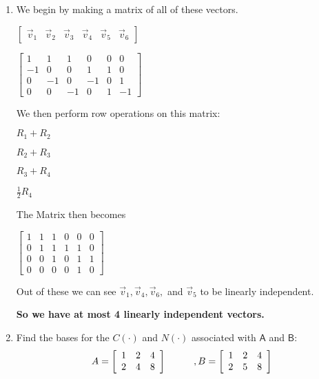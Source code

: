 \documentclass[a4paper, 11pt]{article}
\newcommand{\mat}[1]{\boldsymbol { \mathsf{#1}} }
\begin{document}
\begin{enumerate}
\item We begin by making a matrix of all of these vectors. 

\begin{center}

$
\begin{bmatrix}
\vec v_1 & \vec v_2 & \vec v_3 & \vec v_4 & \vec v_5 & \vec v_6  
\end{bmatrix}
$

$
\begin{bmatrix}
1 & 1 & 1 & 0 & 0 & 0 \\
-1 & 0 & 0 & 1 & 1 & 0\\
0 & -1 & 0 & -1 & 0 & 1\\ 
0 & 0 & -1 & 0 & 1 & -1 
\end{bmatrix}
$

\end{center}

We then perform row operations on this matrix:
\begin{center}
$R_1 + R_2$

$R_2 + R_3$

$R_3 + R_4$

$\frac{1}{2} R_4$
\end{center}

The Matrix then becomes 

\begin{center}
$
\begin{bmatrix}
1 & 1 & 1 & 0 & 0 & 0 \\
0 & 1 & 1 & 1 & 1 & 0\\
0 & 0 & 1 & 0 & 1 & 1\\ 
0 & 0 & 0 & 0 & 1 & 0 
\end{bmatrix}
$
\end{center}

Out of these we can see $\vec v_1, \vec v_4, \vec v_6,$ and $\vec v_5$ to be linearly independent.

\textbf{So we have at most 4 linearly independent vectors.}


\item Find the bases for the $C(\mat \cdot)$ and $N(\mat \cdot)$ associated with $\mat A$ and $\mat B$:
\[ A = \left[ \begin{array}{ccc}
1&2&4\\
2&4&8
\end{array} \right]
\hspace{10mm}, B = \left[ \begin{array}{ccc}
1&2&4\\
2&5&8
\end{array} \right]\]


\end{enumerate}
\end{document}
